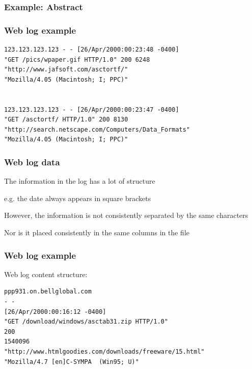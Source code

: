 \documentclass[12pt]{beamer}\usepackage[]{graphicx}\usepackage[]{color}
\begin{document}

\begin{frame}
\frametitle{Example: Abstract}
\begin{center}
\end{center}
\end{frame}


\begin{frame}
\begin{center}
\Huge{}
\end{center}
\end{frame}


\begin{frame}[fragile]
\frametitle{Web log example}

\begin{verbatim}
123.123.123.123 - - [26/Apr/2000:00:23:48 -0400] 
"GET /pics/wpaper.gif HTTP/1.0" 200 6248 
"http://www.jafsoft.com/asctortf/" 
"Mozilla/4.05 (Macintosh; I; PPC)"


123.123.123.123 - - [26/Apr/2000:00:23:47 -0400] 
"GET /asctortf/ HTTP/1.0" 200 8130 
"http://search.netscape.com/Computers/Data_Formats" 
"Mozilla/4.05 (Macintosh; I; PPC)"
\end{verbatim}

\end{frame}


\begin{frame}
\frametitle{Web log data}

\bi
  \item The information in the log has a lot of structure
  \item e.g. the date always appears in square brackets
  \item However, the information is not consistently separated by the same characters
  \item Nor is it placed consistently in the same columns in the file
\ei

\end{frame}


\begin{frame}[fragile]
\frametitle{Web log example}

Web log content structure:
\bigskip

{\small
\begin{verbatim}
ppp931.on.bellglobal.com
- -
[26/Apr/2000:00:16:12 -0400]
"GET /download/windows/asctab31.zip HTTP/1.0"
200
1540096
"http://www.htmlgoodies.com/downloads/freeware/15.html"
"Mozilla/4.7 [en]C-SYMPA  (Win95; U)"
\end{verbatim}
}

\end{frame}
\end{document}
